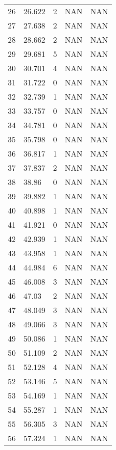 \documentclass{article}
\begin{document}
\begin{longtable}{@{}lllll@{}}
					26  & 26.622  & 2     & NAN   & NAN   \\
					27  & 27.638  & 2     & NAN   & NAN   \\
					28  & 28.662  & 2     & NAN   & NAN   \\
					29  & 29.681  & 5     & NAN   & NAN   \\
					30  & 30.701  & 4     & NAN   & NAN   \\
					31  & 31.722  & 0     & NAN   & NAN   \\
					32  & 32.739  & 1     & NAN   & NAN   \\
					33  & 33.757  & 0     & NAN   & NAN   \\
					34  & 34.781  & 0     & NAN   & NAN   \\
					35  & 35.798  & 0     & NAN   & NAN   \\
					36  & 36.817  & 1     & NAN   & NAN   \\
					37  & 37.837  & 2     & NAN   & NAN   \\
					38  & 38.86   & 0     & NAN   & NAN   \\
					39  & 39.882  & 1     & NAN   & NAN   \\
					40  & 40.898  & 1     & NAN   & NAN   \\
					41  & 41.921  & 0     & NAN   & NAN   \\
					42  & 42.939  & 1     & NAN   & NAN   \\
					43  & 43.958  & 1     & NAN   & NAN   \\
					44  & 44.984  & 6     & NAN   & NAN   \\
					45  & 46.008  & 3     & NAN   & NAN   \\
					46  & 47.03   & 2     & NAN   & NAN   \\
					47  & 48.049  & 3     & NAN   & NAN   \\
					48  & 49.066  & 3     & NAN   & NAN   \\
					49  & 50.086  & 1     & NAN   & NAN   \\
					50  & 51.109  & 2     & NAN   & NAN   \\
					51  & 52.128  & 4     & NAN   & NAN   \\
					52  & 53.146  & 5     & NAN   & NAN   \\
					53  & 54.169  & 1     & NAN   & NAN   \\
					54  & 55.287  & 1     & NAN   & NAN   \\
					55  & 56.305  & 3     & NAN   & NAN   \\
					56  & 57.324  & 1     & NAN   & NAN   \\

\end{longtable}
\end{document}
